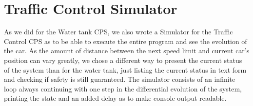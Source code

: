 \section{Traffic Control Simulator}
\label{app:sec:TrafficSim}

As we did for the Water tank CPS, we also wrote a Simulator for the Traffic Control CPS as to be able to execute the entire program and see the evolution of the car. As the amount of distance between the next speed limit and current car's position can vary greatly, we chose a different way to present the current status of the system than for the water tank, just listing the current status in text form and checking if safety is still guaranteed. The simulator consists of an infinite loop always continuing with one step in the differential evolution of the system, printing the state and an added delay as to make console output readable.

